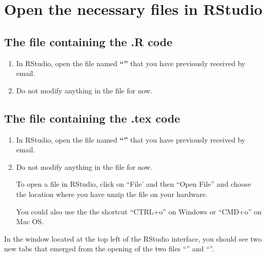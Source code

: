 \documentclass[11pt]{article}
\begin{document}
\section{Open the necessary files in RStudio} %
\label{sec:rstudio}

    \subsection{The file containing the .R code} %
        \begin{enumerate}
          \item In RStudio, open the file named \textbf{``''} that you have previously received by email.          
          \item Do not modify anything in the file for now.
        \end{enumerate}

    \subsection{The file containing the .tex code} %
        \begin{enumerate}
            \item In RStudio, open the file named \textbf{``''} that you have previously received by email.          
            \item Do not modify anything in the file for now.

                To open a file in RStudio, click on ``File' and then ``Open File'' and choose the location where you have unzip the file \R on your hardware.
                \begin{figure}[H]
                	\centering
                \end{figure}
                You could also use the the shortcut ``CTRL+o'' on Windows or ``CMD+o'' on Mac OS.
        \end{enumerate}

\newpage

    In the window located at the top left of the RStudio interface, you should see two new tabs that emerged from the opening of the two files ``\textbf{}'' and ``\textbf{}''.
\end{document}

